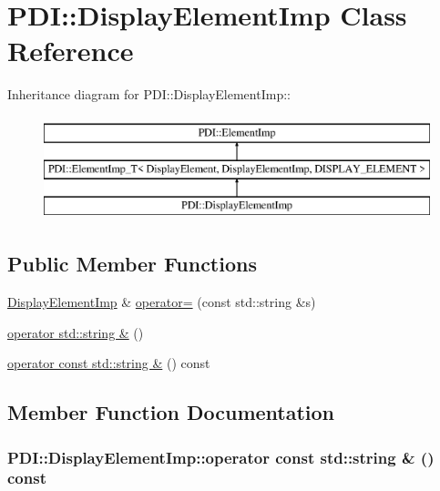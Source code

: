 \hypertarget{class_p_d_i_1_1_display_element_imp}{
\section{PDI::DisplayElementImp Class Reference}
\label{class_p_d_i_1_1_display_element_imp}
}
Inheritance diagram for PDI::DisplayElementImp::\begin{figure}[H]
\begin{center}
\leavevmode
\includegraphics[height=3cm]{class_p_d_i_1_1_display_element_imp}
\end{center}
\end{figure}
\subsection*{Public Member Functions}
\begin{CompactItemize}
\item 
\hyperlink{class_p_d_i_1_1_display_element_imp}{DisplayElementImp} \& \hyperlink{class_p_d_i_1_1_display_element_imp_58defe0cc1c314ee834673023be19e99}{operator=} (const std::string \&s)
\item 
\hyperlink{class_p_d_i_1_1_display_element_imp_464058c9d80e94581af8532114afb60b}{operator std::string \&} ()
\item 
\hyperlink{class_p_d_i_1_1_display_element_imp_96fbbe29f3b7cde42145a08d5d669269}{operator const std::string \&} () const 
\end{CompactItemize}


\subsection{Member Function Documentation}
\hypertarget{class_p_d_i_1_1_display_element_imp_96fbbe29f3b7cde42145a08d5d669269}{
\subsubsection[{operator const std::string \&}]{\setlength{\rightskip}{0pt plus 5cm}PDI::DisplayElementImp::operator const std::string \& () const}}
\label{class_p_d_i_1_1_display_element_imp_96fbbe29f3b7cde42145a08d5d669269}


